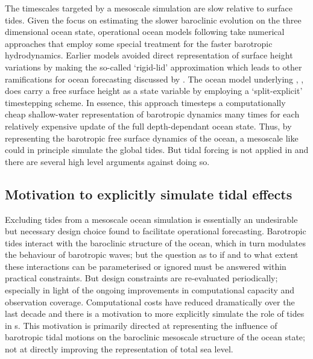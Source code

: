 The timescales targeted by a mesoscale simulation are slow relative to surface tides.
Given the focus on estimating the slower baroclinic evolution on the three dimensional ocean state, operational ocean models following \GODAE{} take numerical approaches that employ some special treatment for the faster barotropic hydrodynamics. 
Earlier models avoided direct representation of surface height variations by making the so-called `rigid-lid' approximation \citep[pp128]{gill1982atmosphere} which leads to other ramifications for ocean forecasting discussed by \citet[pp19]{Griffies:2004vs}.
The ocean model underlying \BL{}, \MOM{} \citep{Griffies:2008vh}, does carry a free surface height as a state variable by employing a `split-explicit' timestepping scheme.    
In essence, this approach timesteps a computationally cheap shallow-water representation of barotropic dynamics many times for each relatively expensive update of the full depth-dependant ocean state.  
Thus, by representing the barotropic free surface dynamics of the ocean, a mesoscale \OGCM{} like \BL{} could in principle simulate the global tides.
But tidal forcing is not applied in \BL{} and there are several high level arguments against doing so.
   
\subsection{Motivation to explicitly simulate tidal effects}

Excluding tides from a mesoscale ocean simulation is essentially an undesirable but necessary design choice found to facilitate operational forecasting.
Barotropic tides interact with the baroclinic structure of the ocean, which in turn modulates the behaviour of barotropic waves; but the question as to if and to what extent these interactions can be parameterised or ignored must be answered within practical constraints.
But design constraints are re-evaluated periodically; especially in light of the ongoing improvements in computational capacity and observation coverage.
Computational costs have reduced dramatically over the last decade and there is a motivation  to more explicitly simulate the role of tides in \OGCM{}s.
This motivation is primarily directed at representing the influence of barotropic tidal motions on the baroclinic mesoscale structure of the ocean state; not at directly improving the representation of total sea level.

